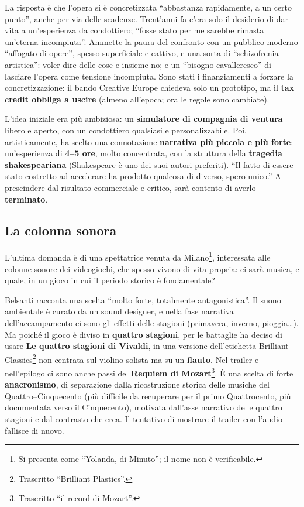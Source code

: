 La risposta è che l'opera si è concretizzata ``abbastanza rapidamente, a un
certo punto'', anche per via delle scadenze. Trent'anni fa c'era solo il
desiderio di dar vita a un'esperienza da condottiero; ``fosse stato per me
sarebbe rimasta un'eterna incompiuta''. Ammette la paura del confronto con un
pubblico moderno ``affogato di opere'', spesso superficiale e cattivo, e una sorta
di ``schizofrenia artistica'': voler dire delle cose e insieme no; e un
``bisogno cavalleresco'' di lasciare l'opera come tensione incompiuta. Sono stati
i finanziamenti a forzare la concretizzazione: il bando Creative Europe chiedeva
solo un prototipo, ma il \textbf{tax credit obbliga a uscire} (almeno all'epoca;
ora le regole sono cambiate).

L'idea iniziale era più ambiziosa: un \textbf{simulatore di compagnia di
ventura} libero e aperto, con un condottiero qualsiasi e personalizzabile. Poi,
artisticamente, ha scelto una connotazione \textbf{narrativa più piccola e più
forte}: un'esperienza di \textbf{4--5 ore}, molto concentrata, con la struttura
della \textbf{tragedia shakespeariana} (Shakespeare è uno dei suoi autori
preferiti). ``Il fatto di essere stato costretto ad accelerare ha prodotto
qualcosa di diverso, spero unico.'' A prescindere dal risultato commerciale e
critico, sarà contento di averlo \textbf{terminato}.

\subsection{La colonna sonora}

L'ultima domanda è di una spettatrice venuta da Milano\footnote{Si presenta
come ``Yolanda, di Minuto''; il nome non è verificabile.}, interessata alle
colonne sonore dei videogiochi, che spesso vivono di vita propria: ci sarà
musica, e quale, in un gioco in cui il periodo storico è fondamentale?

Belsanti racconta una scelta ``molto forte, totalmente antagonistica''. Il
suono ambientale è curato da un sound designer, e nella fase narrativa
dell'accampamento ci sono gli effetti delle stagioni (primavera, inverno,
pioggia\dots). Ma poiché il gioco è diviso in \textbf{quattro stagioni}, per le
battaglie ha deciso di usare \textbf{Le quattro stagioni di Vivaldi}, in una
versione dell'etichetta Brilliant Classics\footnote{Trascritto ``Brilliant
Plastics''.} non centrata sul violino solista ma su un \textbf{flauto}. Nel
trailer e nell'epilogo ci sono anche passi del \textbf{Requiem di
Mozart}\footnote{Trascritto ``il record di Mozart''.}. È una scelta di forte
\textbf{anacronismo}, di separazione dalla ricostruzione storica delle musiche
del Quattro--Cinquecento (più difficile da recuperare per il primo Quattrocento,
più documentata verso il Cinquecento), motivata dall'asse narrativo delle
quattro stagioni e dal contrasto che crea. Il tentativo di mostrare il trailer
con l'audio fallisce di nuovo.

